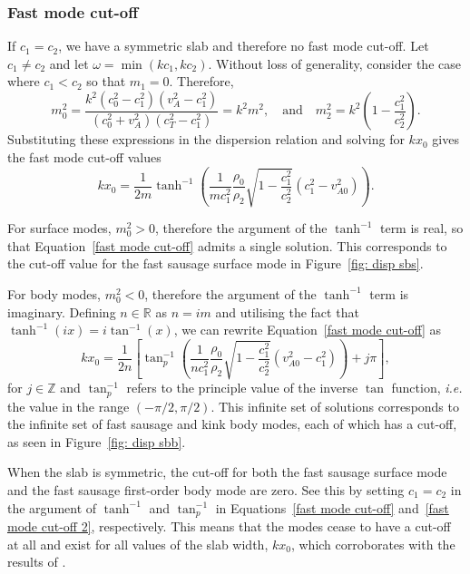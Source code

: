 \documentclass[12pt,draft]{../style-files/ociamthesis}
\begin{document}
\subsubsection{Fast mode cut-off} \label{sec: fast mode cut-off}
If $c_1 = c_2$, we have a symmetric slab and therefore no fast mode cut-off. Let $c_1 \neq c_2$ and let $\omega = \min(kc_1, kc_2)$. Without loss of generality, consider the case where $c_1 < c_2$ so that $m_1 = 0$. Therefore,
\begin{equation}
m_0^2 = \frac{k^2 (c_0^2 - c_1^2)(v_A^2 - c_1^2)}{(c_0^2 + v_A^2)(c_T^2 - c_1^2)} = k^2m^2,
\quad \text{and} \quad
m_2^2 = k^2\left(1-\frac{c_1^2}{c_2^2}\right).
\end{equation}
Substituting these expressions in the dispersion relation and solving for $kx_0$ gives the fast mode cut-off values
\begin{equation}
kx_0 = \frac{1}{2m} \tanh^{-1}\left( \frac{1}{m c_1^2} \frac{\rho_0}{\rho_2} \sqrt{1 - \frac{c_1^2}{c_2^2}}(c_1^2 - v_{A0}^2) \right). \label{fast mode cut-off}
\end{equation}

For surface modes, $m_0^2 > 0$, therefore the argument of the $\tanh^{-1}$ term is real, so that Equation~\eqref{fast mode cut-off} admits a single solution. This corresponds to the cut-off value for the fast sausage surface mode in Figure~\ref{fig: disp sbs}.
 
For body modes, $m_0^2 < 0$, therefore the argument of the $\tanh^{-1}$ term is imaginary. Defining $n \in \mathbb{R}$ as $n = im$ and utilising the fact that $\tanh^{-1}(ix) = i\tan^{-1}(x)$, we can rewrite Equation~\eqref{fast mode cut-off} as
\begin{equation}
kx_0 = \frac{1}{2n} \left[\tan_p^{-1}\left( \frac{1}{n c_1^2} \frac{\rho_0}{\rho_2} \sqrt{1 - \frac{c_1^2}{c_2^2}}(v_{A0}^2 - c_1^2) \right) + j\pi \right], \label{fast mode cut-off 2}
\end{equation}
for $j \in \mathbb{Z}$ and $\tan_p^{-1}$ refers to the principle value of the inverse $\tan$ function, \textit{i.e.} the value in the range $(-\pi/2, \pi/2)$. This infinite set of solutions corresponds to the infinite set of fast sausage and kink body modes, each of which has a cut-off, as seen in Figure~\ref{fig: disp sbb}.

When the slab is symmetric, the cut-off for both the fast sausage surface mode and the fast sausage first-order body mode are zero. See this by setting $c_1 = c_2$ in the argument of $\tanh^{-1}$ and $\tan_p^{-1}$ in Equations~\eqref{fast mode cut-off} and~\eqref{fast mode cut-off 2}, respectively. This means that the modes cease to have a cut-off at all and exist for all values of the slab width, $kx_0$, which corroborates with the results of \cite{rob81b}.
\end{document}

